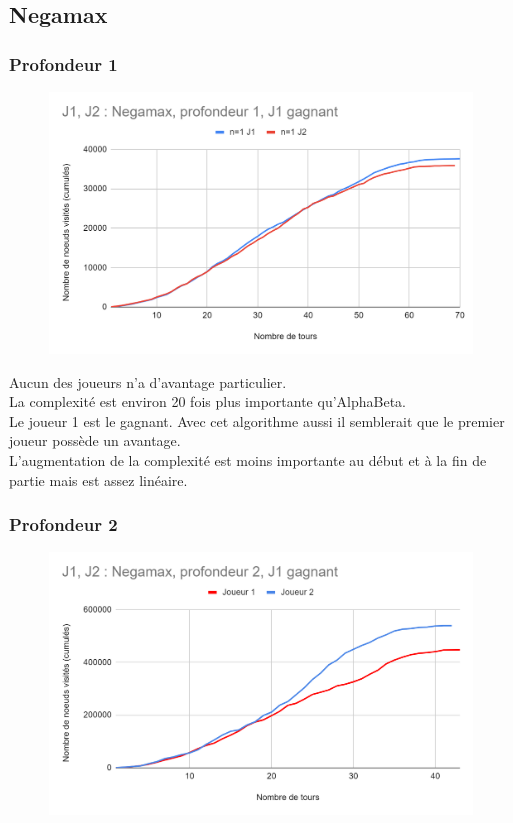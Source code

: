 \documentclass[12pt]{article}
\begin{document}
\subsection{Negamax}

\subsubsection{Profondeur 1}

\begin{figure}[!h]
   \includegraphics[width=\textwidth]{prof1negamax.png}
\end{figure}

Aucun des joueurs n’a d’avantage particulier.\\
La complexité est environ 20 fois plus importante qu’AlphaBeta.\\
Le joueur 1 est le gagnant. Avec cet algorithme aussi il semblerait que le premier joueur possède un avantage.\\
L’augmentation de la complexité est moins importante au début et à la fin de partie mais est assez linéaire.

\subsubsection{Profondeur 2}

\begin{figure}[!h]
   \includegraphics[width=\textwidth]{prof2negamax.png}
\end{figure}
\end{document}
